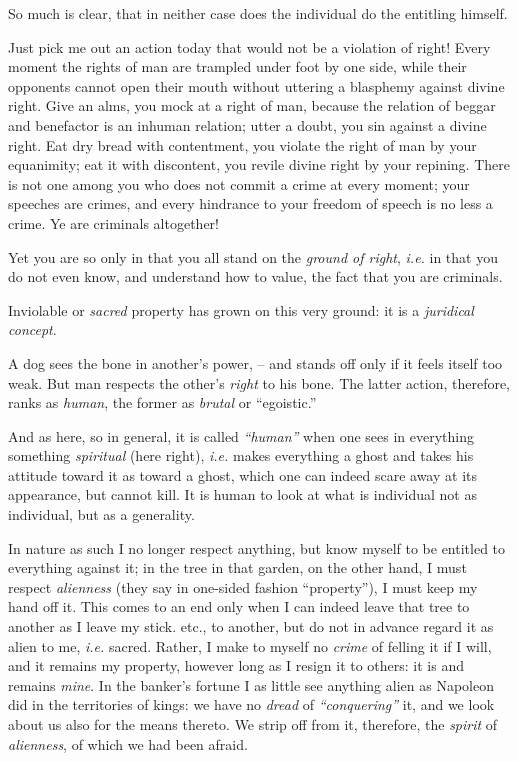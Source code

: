 \documentclass[12pt,a4paper]{book}
\begin{document}
So much is clear, that in neither case does the individual do the entitling 
himself.

Just pick me out an action today that would not be a violation of right! Every 
moment the rights of man are trampled under foot by one side, while their 
opponents cannot open their mouth without uttering a blasphemy against divine 
right. Give an alms, you mock at a right of man, because the relation of 
beggar and benefactor is an inhuman relation; utter a doubt, you sin against a 
divine right. Eat dry bread with contentment, you violate the right of man by 
your equanimity; eat it with discontent, you revile divine right by your 
repining. There is not one among you who does not commit a crime at every 
moment; your speeches are crimes, and every hindrance to your freedom of 
speech is no less a crime. Ye are criminals altogether!

Yet you are so only in that you all stand on the \textit{ground of right}, 
\textit{i.e.} in that you do not even know, and understand how to value, the 
fact that you are criminals.

Inviolable or \textit{sacred} property has grown on this very ground: it is a 
\textit{juridical concept}.

A dog sees the bone in another's power, -- and stands off only if it feels 
itself too weak. But man respects the other's \textit{right} to his bone. The 
latter action, therefore, ranks as \textit{human}, the former as 
\textit{brutal} or ``egoistic.''

And as here, so in general, it is called \textit{``human''} when one sees in 
everything something \textit{spiritual} (here right), \textit{i.e.} makes 
everything a ghost and takes his attitude toward it as toward a ghost, which 
one can indeed scare away at its appearance, but cannot kill. It is human to 
look at what is individual not as individual, but as a generality.

In nature as such I no longer respect anything, but know myself to be entitled 
to everything against it; in the tree in that garden, on the other hand, I 
must respect \textit{alienness} (they say in one-sided fashion 
``property''), I must keep my hand off it. This comes to an end only when I 
can indeed leave that tree to another as I leave my stick. etc., to another, 
but do not in advance regard it as alien to me, \textit{i.e.} sacred. Rather, 
I make to myself no \textit{crime} of felling it if I will, and it remains my 
property, however long as I resign it to others: it is and remains 
\textit{mine}. In the banker's fortune I as little see anything alien as 
Napoleon did in the territories of kings: we have no \textit{dread} of 
\textit{``conquering''} it, and we look about us also for the means thereto. 
We strip off from it, therefore, the \textit{spirit} of \textit{alienness}, of 
which we had been afraid.
\end{document}
